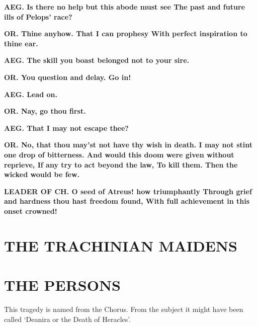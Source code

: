\documentclass[11pt,letter]{book}
\begin{document}
\par \textbf{AEG. Is there no help but this abode must see The past and future ills of Pelops’ race?}
\par 

\par \textbf{OR. Thine anyhow. That I can prophesy With perfect inspiration to thine ear.}
\par 

\par \textbf{AEG. The skill you boast belonged not to your sire.}
\par 

\par \textbf{OR. You question and delay. Go in!}
\par 

\par \textbf{AEG. Lead on.}
\par 

\par \textbf{OR. Nay, go thou first.}
\par 

\par \textbf{AEG. That I may not escape thee?}
\par 

\par \textbf{OR. No, that thou may’st not have thy wish in death. I may not stint one drop of bitterness. And would this doom were given without reprieve, If any try to act beyond the law, To kill them. Then the wicked would be few.}
\par 

\par \textbf{LEADER OF CH. O seed of Atreus! how triumphantly Through grief and hardness thou hast freedom found, With full achievement in this onset crowned!}
\par 
\section{THE TRACHINIAN MAIDENS}\section{THE PERSONS} 
\par  [page 176] This tragedy is named from the Chorus. From the subject it might have been called ‘Deanira or the Death of Heracles’.
\end{document}
